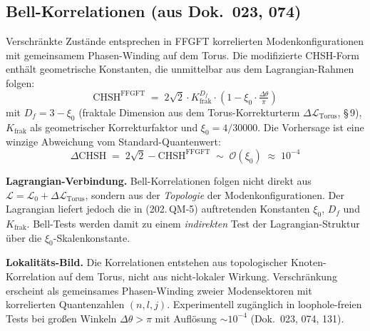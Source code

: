 \subsection*{Bell-Korrelationen (aus Dok.~023, 074)}

Verschränkte Zustände entsprechen in FFGFT korrelierten
Modenkonfigurationen mit gemeinsamem Phasen-Winding auf dem Torus.
Die modifizierte CHSH-Form enthält geometrische Konstanten, die
unmittelbar aus dem Lagrangian-Rahmen folgen:
\begin{equation}
  \mathrm{CHSH}^{\mathrm{FFGFT}}
  \;=\; 2\sqrt{2}\cdot K_{\text{frak}}^{D_f}\cdot
        \left(1 - \xi_0\cdot\tfrac{\Delta\theta}{\pi}\right)
  \tag{202.\,QM-5}
\end{equation}
mit $D_f = 3 - \xi_0$ (fraktale Dimension aus dem Torus-Korrekturterm
$\Delta\mathcal{L}_{\text{Torus}}$, \S\,9), $K_{\text{frak}}$ als
geometrischer Korrekturfaktor und $\xi_0 = 4/30000$. Die Vorhersage ist
eine winzige Abweichung vom Standard-Quantenwert:
\begin{equation}
  \Delta\mathrm{CHSH} \;=\; 2\sqrt{2} - \mathrm{CHSH}^{\mathrm{FFGFT}}
  \;\sim\; \mathcal{O}(\xi_0)\;\approx\; 10^{-4}
  \tag{202.\,QM-6}
\end{equation}

\textbf{Lagrangian-Verbindung.} Bell-Korrelationen folgen nicht direkt
aus $\mathcal{L} = \mathcal{L}_0 + \Delta\mathcal{L}_{\text{Torus}}$,
sondern aus der \emph{Topologie} der Modenkonfigurationen. Der
Lagrangian liefert jedoch die in (202.\,QM-5) auftretenden Konstanten
$\xi_0$, $D_f$ und $K_{\text{frak}}$. Bell-Tests werden damit zu einem
\emph{indirekten} Test der Lagrangian-Struktur über die
$\xi_0$-Skalenkonstante.

\textbf{Lokalitäts-Bild.} Die Korrelationen entstehen aus
topologischer Knoten-Korrelation auf dem Torus, nicht aus
nicht-lokaler Wirkung. Verschränkung erscheint als gemeinsames
Phasen-Winding zweier Modensektoren mit korrelierten Quantenzahlen
$(n,l,j)$. Experimentell zugänglich in loophole-freien Tests bei
großen Winkeln $\Delta\theta > \pi$ mit Auflösung $\sim 10^{-4}$
(Dok.~023, 074, 131).

